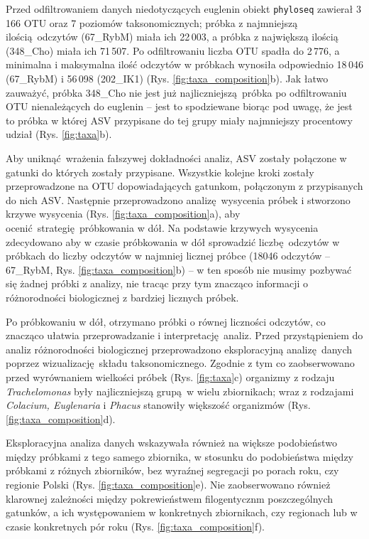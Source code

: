 \documentclass[two column, twoside, a4paper]{article}
\begin{document}
Przed odfiltrowaniem danych niedotyczących euglenin obiekt \texttt{phyloseq} zawierał 3\,166 OTU oraz 7 poziomów taksonomicznych; próbka z najmniejszą ilością odczytów (67\_RybM) miała ich 22\,003, a próbka z największą ilością (348\_Cho) miała ich 71\,507. Po odfiltrowaniu liczba OTU spadła do 2\,776, a minimalna i maksymalna ilość odczytów w próbkach wynosiła odpowiednio 18\,046 (67\_RybM) i 56\,098 (202\_IK1) (Rys. \ref{fig:taxa_composition}b). Jak łatwo zauważyć, próbka 348\_Cho nie jest już najliczniejszą próbka po odfiltrowaniu OTU nienależących do euglenin -- jest to spodziewane biorąc pod uwagę, że jest to próbka w której ASV przypisane do tej grupy miały najmniejszy procentowy udział (Rys. \ref{fig:taxa}b).

Aby uniknąć wrażenia fałszywej dokładności analiz, ASV zostały połączone w gatunki do których zostały przypisane. Wszystkie kolejne kroki zostały przeprowadzone na OTU dopowiadających gatunkom, połączonym z przypisanych do nich ASV. Następnie przeprowadzono analizę wysycenia próbek i stworzono krzywe wysycenia (Rys. \ref{fig:taxa_composition}a), aby ocenić strategię próbkowania w dół. Na podstawie krzywych wysycenia zdecydowano aby w czasie próbkowania w dół sprowadzić liczbę odczytów w próbkach do liczby odczytów w najmniej licznej próbce (18046 odczytów -- 67\_RybM, Rys. \ref{fig:taxa_composition}b) -- w ten sposób nie musimy pozbywać się żadnej próbki z analizy, nie tracąc przy tym znacząco informacji o różnorodności biologicznej z bardziej licznych próbek.

Po próbkowaniu w dół, otrzymano próbki o równej liczności odczytów, co znacząco ułatwia przeprowadzanie i interpretację analiz. Przed przystąpieniem do analiz różnorodności biologicznej przeprowadzono eksploracyjną analizę danych poprzez wizualizację składu taksonomicznego. Zgodnie z tym co zaobserwowano przed wyrównaniem wielkości próbek (Rys. \ref{fig:taxa}c) organizmy z rodzaju \textit{Trachelomonas} były najliczniejszą grupą w wielu zbiornikach; wraz z rodzajami \textit{Colacium, Euglenaria} i \textit{Phacus} stanowiły większość organizmów (Rys. \ref{fig:taxa_composition}d). 

Eksploracyjna analiza danych wskazywała również na większe podobieństwo między próbkami z tego samego zbiornika, w stosunku do podobieństwa między próbkami z różnych zbiorników, bez wyraźnej segregacji po porach roku, czy regionie Polski (Rys. \ref{fig:taxa_composition}e). Nie zaobserwowano również klarownej zależności między pokrewieństwem filogentycznm poszczególnych gatunków, a ich występowaniem w konkretnych zbiornikach, czy regionach lub w czasie konkretnych pór roku (Rys. \ref{fig:taxa_composition}f).
\end{document}
